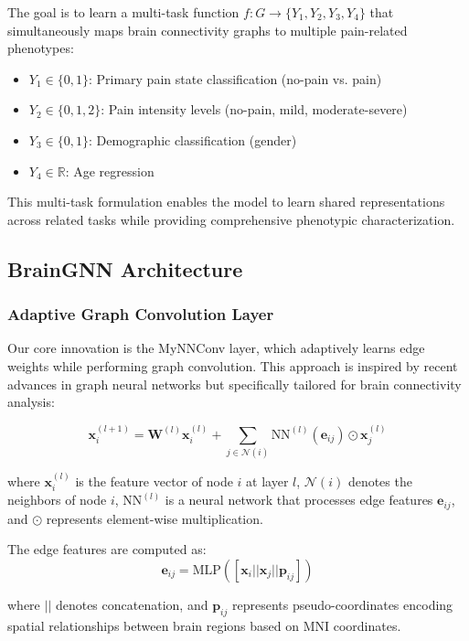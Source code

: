 \documentclass[10pt,journal,compsoc]{IEEEtran}
\begin{document}
The goal is to learn a multi-task function $f: G \rightarrow \{Y_1, Y_2, Y_3, Y_4\}$ that simultaneously maps brain connectivity graphs to multiple pain-related phenotypes:
\begin{itemize}
\item $Y_1 \in \{0, 1\}$: Primary pain state classification (no-pain vs. pain)
\item $Y_2 \in \{0, 1, 2\}$: Pain intensity levels (no-pain, mild, moderate-severe)
\item $Y_3 \in \{0, 1\}$: Demographic classification (gender)
\item $Y_4 \in \mathbb{R}$: Age regression
\end{itemize}
This multi-task formulation enables the model to learn shared representations across related tasks while providing comprehensive phenotypic characterization.

\subsection{BrainGNN Architecture}

\subsubsection{Adaptive Graph Convolution Layer}

Our core innovation is the MyNNConv layer, which adaptively learns edge weights while performing graph convolution. This approach is inspired by recent advances in graph neural networks \cite{hamilton2017inductive} but specifically tailored for brain connectivity analysis:

\begin{equation}
\mathbf{x}_i^{(l+1)} = \mathbf{W}^{(l)} \mathbf{x}_i^{(l)} + \sum_{j \in \mathcal{N}(i)} \text{NN}^{(l)}(\mathbf{e}_{ij}) \odot \mathbf{x}_j^{(l)}
\end{equation}

where $\mathbf{x}_i^{(l)}$ is the feature vector of node $i$ at layer $l$, $\mathcal{N}(i)$ denotes the neighbors of node $i$, $\text{NN}^{(l)}$ is a neural network that processes edge features $\mathbf{e}_{ij}$, and $\odot$ represents element-wise multiplication.

The edge features are computed as:
\begin{equation}
\mathbf{e}_{ij} = \text{MLP}([\mathbf{x}_i || \mathbf{x}_j || \mathbf{p}_{ij}])
\end{equation}

where $||$ denotes concatenation, and $\mathbf{p}_{ij}$ represents pseudo-coordinates encoding spatial relationships between brain regions based on MNI coordinates.
\end{document}
